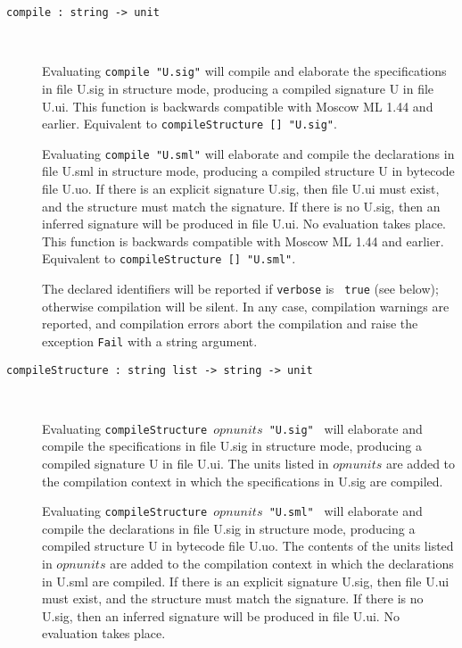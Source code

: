 \documentclass[fleqn,a4paper]{article}
\begin{document}
\begin{description}

\item[{\tt compile :\ string -> unit}]\mbox{ }
  
  Evaluating {\tt compile "{\rm U.sig}"} will compile and elaborate
  the specifications in file U.sig in structure mode, producing a
  compiled signature U in file U.ui.  This function is backwards
  compatible with Moscow ML 1.44 and earlier.  Equivalent to
  \texttt{compileStructure [] "{\rm U.sig}"}.
  
  Evaluating {\tt compile "{\rm U.sml}"} will elaborate and compile
  the declarations in file U.sml in structure mode, producing a
  compiled structure U in bytecode file U.uo.  If there is an explicit
  signature U.sig, then file U.ui must exist, and the structure must
  match the signature.  If there is no U.sig, then an inferred
  signature will be produced in file U.ui.  No evaluation takes place.
  This function is backwards compatible with Moscow ML 1.44 and
  earlier.  Equivalent to \texttt{compileStructure [] "{\rm U.sml}"}.

  The declared identifiers will be reported if {\tt verbose} is {\tt
    true} (see below); otherwise compilation will be silent.  In any
    case, compilation warnings are reported, and compilation errors
    abort the compilation and raise the exception {\tt Fail} with a
    string argument.

\item[{\tt compileStructure :\ string list -> string -> unit}]\mbox{ }
  
  Evaluating \texttt{compileStructure $opnunits$ "{\rm U.sig}"
    } will elaborate and compile the specifications in file U.sig in
  structure mode, producing a compiled signature U in file U.ui.  The
  units listed in $opnunits$ are added to the compilation
  context in which the specifications in U.sig are compiled.  
  
  Evaluating \texttt{compileStructure $opnunits$ "{\rm U.sml}"
    } will elaborate and compile the declarations in file U.sig in
  structure mode, producing a compiled structure U in bytecode file
  U.uo.  The contents of the units listed in $opnunits$ are
  added to the compilation context in which the declarations in U.sml
  are compiled.  If there is an explicit signature U.sig, then file
  U.ui must exist, and the structure must match the signature.  If
  there is no U.sig, then an inferred signature will be produced in
  file U.ui.  No evaluation takes place.



\end{description}
\end{document}
